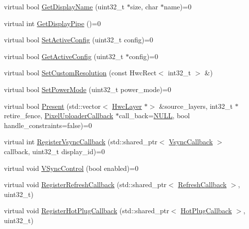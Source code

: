 \begin{DoxyCompactItemize}
\item 
virtual bool \mbox{\hyperlink{classhwcomposer_1_1NativeDisplay_a28c095d6d08c84e40b5d5160d038f0b5}{Get\+Display\+Name}} (uint32\+\_\+t $\ast$size, char $\ast$name)=0
\item 
virtual int \mbox{\hyperlink{classhwcomposer_1_1NativeDisplay_aaf80095ae6aed35c64dd633a6a2f101a}{Get\+Display\+Pipe}} ()=0
\item 
virtual bool \mbox{\hyperlink{classhwcomposer_1_1NativeDisplay_a63c51853e0d82baf9d6445cf831a5ad1}{Set\+Active\+Config}} (uint32\+\_\+t config)=0
\item 
virtual bool \mbox{\hyperlink{classhwcomposer_1_1NativeDisplay_a9d4d9d2f6633fe37025210cac6e8cc6c}{Get\+Active\+Config}} (uint32\+\_\+t $\ast$config)=0
\item 
virtual bool \mbox{\hyperlink{classhwcomposer_1_1NativeDisplay_a8c3c29de10cc3c6e33a90e176d65b003}{Set\+Custom\+Resolution}} (const Hwc\+Rect$<$ int32\+\_\+t $>$ \&)
\item 
virtual bool \mbox{\hyperlink{classhwcomposer_1_1NativeDisplay_a9ea847cb1e75677fca7dabbcfb59a26a}{Set\+Power\+Mode}} (uint32\+\_\+t power\+\_\+mode)=0
\item 
virtual bool \mbox{\hyperlink{classhwcomposer_1_1NativeDisplay_a4825b8bc4b85e03b396ed6d2cf5bd8c0}{Present}} (std\+::vector$<$ \mbox{\hyperlink{structhwcomposer_1_1HwcLayer}{Hwc\+Layer}} $\ast$$>$ \&source\+\_\+layers, int32\+\_\+t $\ast$retire\+\_\+fence, \mbox{\hyperlink{classhwcomposer_1_1PixelUploaderCallback}{Pixel\+Uploader\+Callback}} $\ast$call\+\_\+back=\mbox{\hyperlink{alios_2platformdefines_8h_a070d2ce7b6bb7e5c05602aa8c308d0c4}{N\+U\+LL}}, bool handle\+\_\+constraints=false)=0
\item 
virtual int \mbox{\hyperlink{classhwcomposer_1_1NativeDisplay_a0732e4b24a348aaf1e0b801b9a5f3c39}{Register\+Vsync\+Callback}} (std\+::shared\+\_\+ptr$<$ \mbox{\hyperlink{classhwcomposer_1_1VsyncCallback}{Vsync\+Callback}} $>$ callback, uint32\+\_\+t display\+\_\+id)=0
\item 
virtual void \mbox{\hyperlink{classhwcomposer_1_1NativeDisplay_a6817e88bc9def8ae1ae8088922803dc1}{V\+Sync\+Control}} (bool enabled)=0
\item 
virtual void \mbox{\hyperlink{classhwcomposer_1_1NativeDisplay_a237627e6cacf9246813bc7f48c5817cd}{Register\+Refresh\+Callback}} (std\+::shared\+\_\+ptr$<$ \mbox{\hyperlink{classhwcomposer_1_1RefreshCallback}{Refresh\+Callback}} $>$, uint32\+\_\+t)
\item 
virtual void \mbox{\hyperlink{classhwcomposer_1_1NativeDisplay_a4080879c203571d6404ba3b3aff53631}{Register\+Hot\+Plug\+Callback}} (std\+::shared\+\_\+ptr$<$ \mbox{\hyperlink{classhwcomposer_1_1HotPlugCallback}{Hot\+Plug\+Callback}} $>$, uint32\+\_\+t)
$$
\end{DoxyCompactItemize}
